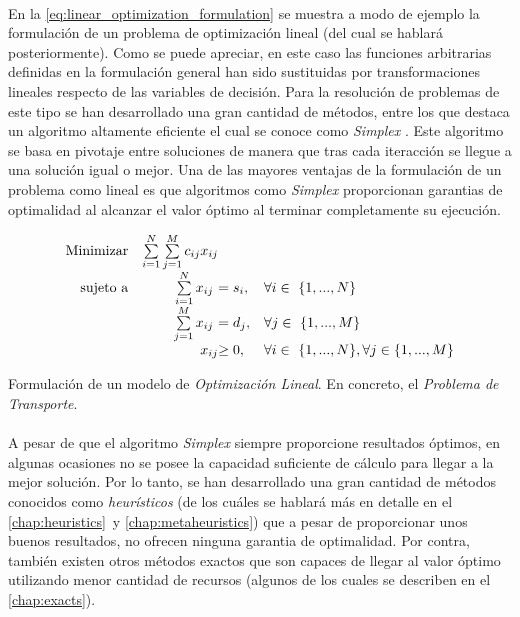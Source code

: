 \documentclass{subfiles}
\begin{document}
        \paragraph{}
        En la \cref{eq:linear_optimization_formulation} se muestra a modo de ejemplo la formulación de un problema de optimización lineal (del cual se hablará posteriormente). Como se puede apreciar, en este caso las funciones arbitrarias definidas en la formulación general han sido sustituidas por transformaciones lineales respecto de las variables de decisión. Para la resolución de problemas de este tipo se han desarrollado una gran cantidad de métodos, entre los que destaca un algoritmo altamente eficiente el cual se conoce como \emph{Simplex} \cite{klee1970good}. Este algoritmo se basa en pivotaje entre soluciones de manera que tras cada iteracción se llegue a una solución igual o mejor. Una de las mayores ventajas de la formulación de un problema como lineal es que algoritmos como \emph{Simplex} proporcionan garantias de optimalidad al alcanzar el valor óptimo al terminar completamente su ejecución.

        \begin{eqfloat}
          \begin{equation}
            \begin{array}{rr@{}ll}
              \text{Minimizar} & \sum\limits_{i = 1}^{N}\sum\limits_{j = 1}^{M}  c_{ij}x_{ij} &                 & \\
              \text{sujeto a}	 & \sum\limits_{i = 1}^{N} x_{ij} \ &= s_{i}, & \forall i \in \{1,...,N\} \\
                               & \sum\limits_{j = 1}^{M} x_{ij} \ &= d_{j}, & \forall j \in \{1,...,M\} \\
                               &                               	x_{ij} 	&\geq 0, 	                 & \forall i \in \{1,...,N\},\forall j \in \{1,...,M\}
            \end{array}
          \end{equation}
          \caption{Formulación de un modelo de \emph{Optimización Lineal}. En concreto, el \emph{Problema de Transporte}.}
          \label{eq:linear_optimization_formulation}
        \end{eqfloat}

        \paragraph{}
        A pesar de que el algoritmo \emph{Simplex} siempre proporcione resultados óptimos, en algunas ocasiones no se posee la capacidad suficiente de cálculo para llegar a la mejor solución. Por lo tanto, se han desarrollado una gran cantidad de métodos conocidos como \emph{heurísticos} (de los cuáles se hablará más en detalle en el \cref{chap:heuristics} y \cref{chap:metaheuristics}) que a pesar de proporcionar unos buenos resultados, no ofrecen ninguna garantia de optimalidad. Por contra, también existen otros métodos exactos que son capaces de llegar al valor óptimo utilizando menor cantidad de recursos (algunos de los cuales se describen en el \cref{chap:exacts}).
\end{document}
